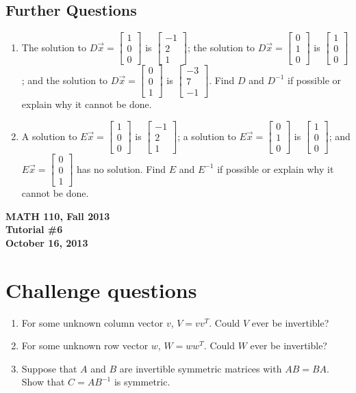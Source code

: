 \documentclass[11pt]{exam}
\newcommand{\mat}[1]{\begin{bmatrix}#1\end{bmatrix}}
\newcommand{\mthCourse}{MATH 110}
\newcommand{\mthTerm}{Fall 2013}
\newcommand{\mthTutorialNumber}{6}
\newcommand{\mthDate}{October 16, 2013}
\begin{document}
\subsection*{Further Questions}
\begin{enumerate}[resume]
	\item The solution to $D\vec x=\mat{1\\0\\0}$ is $\mat{-1\\2\\1}$;
		the solution to $D\vec x=\mat{0\\1\\0}$ is $\mat{1\\0\\0}$;
		and 
		the solution to $D\vec x=\mat{0\\0\\1}$ is $\mat{-3\\7\\-1}$.
		Find $D$ and $D^{-1}$ if possible or explain why it cannot be done.
	\item A solution to $E\vec x=\mat{1\\0\\0}$ is $\mat{-1\\2\\1}$;
		a solution to $E\vec x=\mat{0\\1\\0}$ is $\mat{1\\0\\0}$;
		and 
		$E\vec x=\mat{0\\0\\1}$ has no solution.
		Find $E$ and $E^{-1}$ if possible or explain why it cannot be done.
\end{enumerate}




\newpage
{
	\begin{center}
		{\bf \mthCourse, \mthTerm}\\ 
		{\bf Tutorial \#\mthTutorialNumber}\\
		{\bf \mthDate}
	\end{center}
}

\section*{Challenge questions}

\begin{enumerate}[resume]
	\item For some unknown column vector $v$, $V=vv^T$.  Could $V$ ever be invertible?
	\item For some unknown row vector $w$, $W=ww^T$.  Could $W$ ever be invertible?
	\item Suppose that $A$ and $B$ are invertible symmetric matrices with
		$AB=BA$.  Show that $C=AB^{-1}$ is symmetric.

\end{enumerate}
\end{document}
